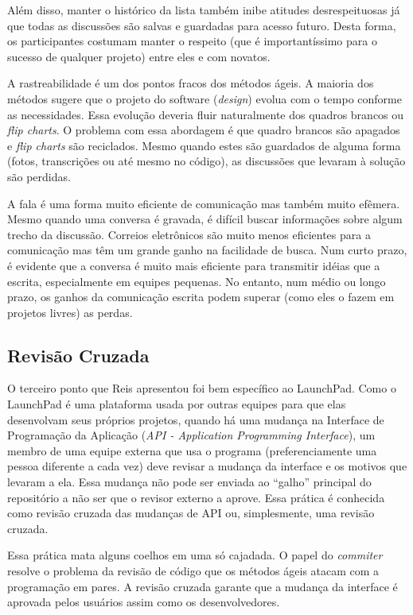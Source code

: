 Além disso, manter o histórico da lista também inibe atitudes
desrespeituosas já que todas as discussões são salvas e guardadas para
acesso futuro. Desta forma, os participantes costumam manter o
respeito (que é importantíssimo para o sucesso de qualquer projeto)
entre eles e com novatos.

A rastreabilidade é um dos pontos fracos dos métodos ágeis. A maioria
dos métodos sugere que o projeto do software (\emph{design}) evolua
com o tempo conforme as necessidades. Essa evolução deveria fluir
naturalmente dos quadros brancos ou \emph{flip charts}. O problema com
essa abordagem é que quadro brancos são apagados e \emph{flip charts}
são reciclados.  Mesmo quando estes são guardados de alguma forma
(fotos, transcrições ou até mesmo no código), as discussões que
levaram à solução são perdidas.

A fala é uma forma muito eficiente de comunicação mas também muito
efêmera. Mesmo quando uma conversa é gravada, é difícil buscar
informações sobre algum trecho da discussão. Correios eletrônicos são
muito menos eficientes para a comunicação mas têm um grande ganho na
facilidade de busca. Num curto prazo, é evidente que a conversa é
muito mais eficiente para transmitir idéias que a escrita,
especialmente em equipes pequenas. No entanto, num médio ou longo
prazo, os ganhos da comunicação escrita podem superar (como eles o
fazem em projetos livres) as perdas.

\subsection{Revisão Cruzada}
\label{subsec:crossrev}

O terceiro ponto que Reis apresentou foi bem específico ao
LaunchPad. Como o LaunchPad é uma plataforma usada por outras equipes
para que elas desenvolvam seus próprios projetos, quando há uma
mudança na Interface de Programação da Aplicação (\emph{API -
  Application Programming Interface}), um membro de uma equipe externa
que usa o programa (preferenciamente uma pessoa diferente a cada vez)
deve revisar a mudança da interface e os motivos que levaram a
ela. Essa mudança não pode ser enviada ao ``galho'' principal do
repositório a não ser que o revisor externo a aprove. Essa prática é
conhecida como revisão cruzada das mudanças de API ou, simplesmente,
uma revisão cruzada.

Essa prática mata alguns coelhos em uma só cajadada. O papel do
\emph{commiter} resolve o problema da revisão de código que os métodos
ágeis atacam com a programação em pares. A revisão cruzada garante que
a mudança da interface é aprovada pelos usuários assim como os
desenvolvedores.

